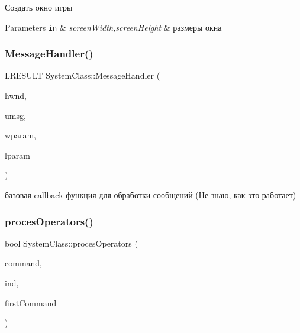 Создать окно игры 


\begin{DoxyParams}[1]{Parameters}
\mbox{\tt in}  & {\em screen\+Width,screen\+Height} & размеры окна \\
\hline
\end{DoxyParams}
\mbox{\label{class_system_class_aeb0f9940a9a82a36f13e267e3989a98b}} 
\subsubsection{\texorpdfstring{Message\+Handler()}{MessageHandler()}}
{\footnotesize\ttfamily L\+R\+E\+S\+U\+LT System\+Class\+::\+Message\+Handler (\begin{DoxyParamCaption}\item[{H\+W\+ND}]{hwnd,  }\item[{U\+I\+NT}]{umsg,  }\item[{W\+P\+A\+R\+AM}]{wparam,  }\item[{L\+P\+A\+R\+AM}]{lparam }\end{DoxyParamCaption})}



базовая callback функция для обработки сообщений (Не знаю, как это работает) 

\mbox{\label{class_system_class_adc6bf9bc3ae14f2ee2f661818a500220}} 
\subsubsection{\texorpdfstring{proces\+Operators()}{procesOperators()}}
{\footnotesize\ttfamily bool System\+Class\+::proces\+Operators (\begin{DoxyParamCaption}\item[{\hyperlink{class_command_class}{Command\+Class} $\ast$}]{command,  }\item[{int}]{ind,  }\item[{int}]{first\+Command }\end{DoxyParamCaption})\hspace{0.3cm}{\ttfamily [private]}}



